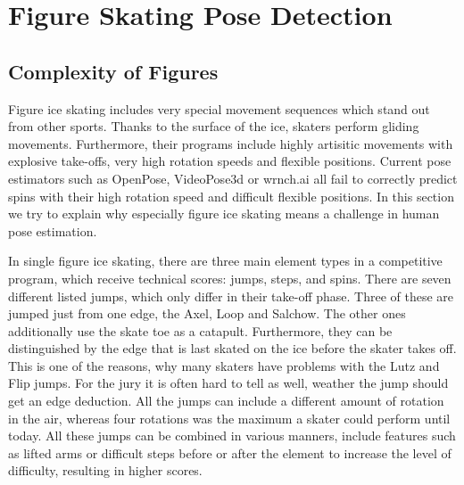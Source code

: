 

\chapter{Figure Skating Pose Detection} %

\label{figureskating} %



\section{Complexity of Figures}
\begin{flushleft}
    Figure ice skating includes very special movement sequences which stand out from other sports.
    Thanks to the surface of the ice, skaters perform gliding movements.
    Furthermore, their programs include highly artisitic
    movements with explosive take-offs, very high rotation speeds and flexible positions.
    Current pose estimators such as OpenPose, VideoPose3d or wrnch.ai all fail to correctly predict
    spins with their high
    rotation speed and difficult flexible positions.
    In this section we try to explain why especially figure ice skating means a challenge in human pose estimation.
\end{flushleft}
\begin{flushleft}
    In single figure ice skating, there are three main element types in a competitive program, which receive
    technical scores:
    jumps, steps, and spins.
    There are seven different listed jumps, which only differ in their take-off phase.
    Three
    of these
    are jumped just from one edge, the Axel, Loop and Salchow.
    The other ones additionally use the skate toe as a catapult.
    Furthermore, they can be distinguished by the edge that is last skated on the ice before the skater takes off.
    This is one of the reasons, why many skaters have problems with the Lutz and Flip jumps.
    For the jury it is often hard to tell as well, weather the jump should get an edge deduction.
    All the jumps can include a different amount of rotation in the air,
    whereas four rotations was the maximum a skater could perform until today.
    All these jumps can be combined in various manners, include features such as lifted arms or difficult steps
    before or after the element to
    increase the level of difficulty, resulting in higher scores.
\end{flushleft}
